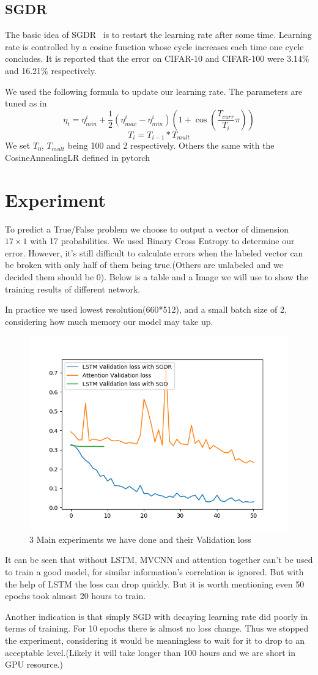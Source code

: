 \documentclass[conference,compsoc]{IEEEtran}
\begin{document}
\subsection{SGDR}
The basic idea of SGDR~\cite{SGDR} is to restart the learning rate after some time. Learning rate is controlled by a cosine function whose cycle increases each time one cycle concludes. It is reported that the error on CIFAR-10 and CIFAR-100 were 3.14\% and 16.21\% respectively. 
\par We used the following formula to update our learning rate. The parameters are tuned as in \cite{SGDR}
$$ \eta_t = \eta_{min}^i + \frac{1}{2}(\eta_{max}^i-\eta_{min}^i)(1 + \cos(\frac{T_{curr}}{T_i}\pi))$$
$$ T_{i} = T_{i-1} * T_{mult} $$
We set $T_0$, $T_{mult}$ being 100 and 2 respectively. Others the same with the CosineAnnealingLR defined in pytorch


\section{Experiment}
To predict a True/False problem we choose to output a vector of dimension $17 \times 1$ with 17 probabilities. 
We used Binary Cross Entropy to determine our error. However, it's still difficult to calculate errors when the labeled vector can be broken with only half of them being true.(Others are unlabeled and we decided them should be 0).
Below is a table and a Image we will use to show the training results of different network.
\par In practice we used lowest resolution(660*512), and a small batch size of 2, considering how much memory our model may take up.  
\begin{figure}[!tp]
	\includegraphics[width=.5\textwidth]{../Pic/3models}
	\caption{3 Main experiments we have done and their Validation loss}
\end{figure}
\par
It can be seen that without LSTM, MVCNN and attention together can't be used to train a good model, for similar information's correlation is ignored. But with the help of LSTM the loss can drop quickly. But it is worth mentioning even 50 epochs took almost 20 hours to train.
\par
Another indication is that simply SGD with decaying learning rate did poorly in terms of training. For 10 epochs there is almost no loss change. Thus we stopped the experiment, considering it would be meaningless to wait for it to drop to an acceptable level.(Likely it will take longer than 100 hours and we are short in GPU resource.)
\end{document}
